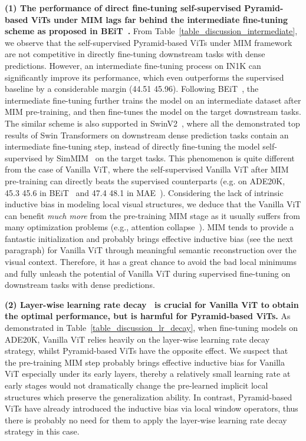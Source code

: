 \documentclass{article}
\begin{document}
\textbf{(1) The performance of direct fine-tuning self-supervised Pyramid-based ViTs under MIM lags far behind the intermediate fine-tuning scheme as proposed in BEiT~\cite{bao2021beit}.} From Table~\ref{table_discussion_intermediate}, we observe that the self-supervised Pyramid-based ViTs under MIM framework are not competitive in directly fine-tuning downstream tasks with dense predictions. However, an intermediate fine-tuning process on IN1K can significantly improve its performance, which even outperforms the supervised baseline by a considerable margin (44.51  45.96). Following BEiT~\cite{bao2021beit}, the intermediate fine-tuning further trains the model on an intermediate dataset after MIM pre-training, and then fine-tunes the model on the target downstream tasks. The similar scheme is also supported in SwinV2~\cite{liu2021swinv2}, where all the demonstrated top results of Swin Transformers on downstream dense prediction tasks contain an intermediate fine-tuning step, instead of directly fine-tuning the model self-supervised by SimMIM~\cite{xie2021simmim} on the target tasks. This phenomenon is quite different from the case of Vanilla ViT, where the self-supervised Vanilla ViT after MIM pre-training can directly beats the supervised counterparts (e.g. on ADE20K,  45.3  45.6 in BEiT~\cite{bao2021beit} and 47.4  48.1 in MAE~\cite{he2021masked}).
Considering the lack of intrinsic inductive bias in modeling local visual structures, 
we deduce that the {Vanilla ViT} can benefit \emph{much more} from the pre-training MIM stage as it usually suffers from many optimization problems (e.g., attention collapse~\cite{zhou2021deepvit}). MIM tends to provide a fantastic initialization and probably brings effective inductive bias (see the next paragraph) for Vanilla ViT through meaningful semantic reconstruction over the visual context. Therefore, it has a great chance to avoid the bad local minimums and fully unleash the potential of Vanilla ViT during supervised fine-tuning on downstream tasks with dense predictions.


\textbf{(2) Layer-wise learning rate decay~\cite{clark2020electra,bao2021beit} is crucial for Vanilla ViT to obtain the optimal performance, but is harmful for Pyramid-based ViTs.} As demonstrated in Table~\ref{table_discussion_lr_decay}, when fine-tuning models on ADE20K, Vanilla ViT relies heavily on the layer-wise learning rate decay strategy, whilst Pyramid-based ViTs have the opposite effect. We suspect that the pre-training MIM step probably brings effective inductive bias for Vanilla ViT especially under its early layers, thereby a relatively small learning rate at early stages would not dramatically change the pre-learned implicit local structures which preserve the generalization ability. In contrast, Pyramid-based ViTs have already introduced the inductive bias via local window operators, thus there is probably no need for them to apply the layer-wise learning rate decay strategy in this case.
\end{document}
